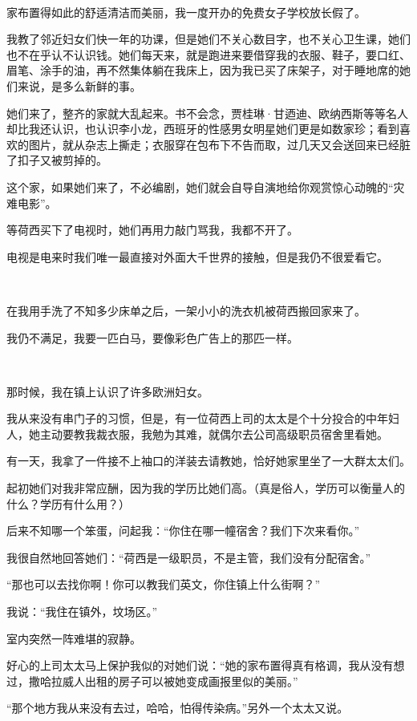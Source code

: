 \par  
\par 家布置得如此的舒适清洁而美丽，我一度开办的免费女子学校放长假了。
\par 我教了邻近妇女们快一年的功课，但是她们不关心数目字，也不关心卫生课，她们也不在乎认不认识钱。她们每天来，就是跑进来要借穿我的衣服、鞋子，要口红、眉笔、涂手的油，再不然集体躺在我床上，因为我已买了床架子，对于睡地席的她们来说，是多么新鲜的事。
\par 她们来了，整齐的家就大乱起来。书不会念，贾桂琳·甘迺迪、欧纳西斯等等名人却比我还认识，也认识李小龙，西班牙的性感男女明星她们更是如数家珍；看到喜欢的图片，就从杂志上撕走；衣服穿在包布下不告而取，过几天又会送回来已经脏了扣子又被剪掉的。
\par 这个家，如果她们来了，不必编剧，她们就会自导自演地给你观赏惊心动魄的“灾难电影”。
\par 等荷西买下了电视时，她们再用力敲门骂我，我都不开了。
\par 电视是电来时我们唯一最直接对外面大千世界的接触，但是我仍不很爱看它。
\par  
\par 在我用手洗了不知多少床单之后，一架小小的洗衣机被荷西搬回家来了。
\par 我仍不满足，我要一匹白马，要像彩色广告上的那匹一样。
\par  
\par 那时候，我在镇上认识了许多欧洲妇女。
\par 我从来没有串门子的习惯，但是，有一位荷西上司的太太是个十分投合的中年妇人，她主动要教我裁衣服，我勉为其难，就偶尔去公司高级职员宿舍里看她。
\par 有一天，我拿了一件接不上袖口的洋装去请教她，恰好她家里坐了一大群太太们。
\par 起初她们对我非常应酬，因为我的学历比她们高。（真是俗人，学历可以衡量人的什么？学历有什么用？）
\par 后来不知哪一个笨蛋，问起我：“你住在哪一幢宿舍？我们下次来看你。”
\par 我很自然地回答她们：“荷西是一级职员，不是主管，我们没有分配宿舍。”
\par “那也可以去找你啊！你可以教我们英文，你住镇上什么街啊？”
\par 我说：“我住在镇外，坟场区。”
\par 室内突然一阵难堪的寂静。
\par 好心的上司太太马上保护我似的对她们说：“她的家布置得真有格调，我从没有想过，撒哈拉威人出租的房子可以被她变成画报里似的美丽。”
\par “那个地方我从来没有去过，哈哈，怕得传染病。”另外一个太太又说。
